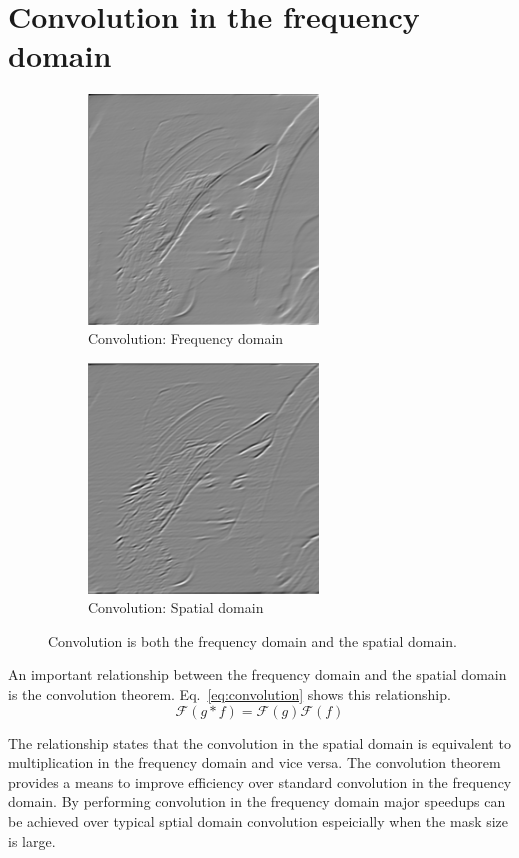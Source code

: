 \documentclass[letterpaper]{article}
\begin{document}
\section{Convolution in the frequency domain}
\begin{figure}[hbtp]
  \centering
  \begin{subfigure}{6.1cm}
    \includegraphics[width=6.1cm]{images/lenna_ft_convolve.png}
    \caption{Convolution: Frequency domain}
  \end{subfigure}
  \begin{subfigure}{6.1cm}
    \includegraphics[width=6.1cm]{images/lenna_convolution.png}
    \caption{Convolution: Spatial domain}
  \end{subfigure}
  \caption{Convolution is both the frequency domain and the spatial domain.}
  \label{fig:convolution}
\end{figure}
An important relationship between the frequency domain and the spatial domain is the convolution theorem. Eq.~\ref{eq:convolution} shows this relationship.
\begin{equation}\label{eq:convolution}
\mathcal{F}(g*f)=\mathcal{F}(g)\mathcal{F}(f) 
\end{equation}

The relationship states that the convolution in the spatial domain is equivalent to multiplication in the frequency domain and vice versa. The convolution theorem provides a means to improve efficiency over standard convolution in the frequency domain. By performing convolution in the frequency domain major speedups can be achieved over typical sptial domain convolution espeicially when the mask size is large.
\end{document}
